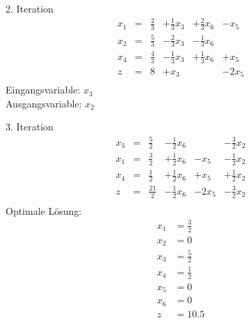\documentclass[a4paper]{scrartcl}
\begin{document}
\begin{enumerate}
\begin{enumerate}
                2. Iteration
                \begin{equation}
                    \begin{array}{rcrrrr}
                        x_1 & = & \frac{2}{3} & +\frac{1}{3}x_3 & +\frac{2}{3}x_6 & -x_5 \\
                        x_2 & = & \frac{5}{3} & -\frac{2}{3}x_3 & -\frac{1}{3}x_6 & \\
                        x_4 & = & \frac{4}{3} & -\frac{1}{3}x_3 & +\frac{1}{3}x_6 & +x_5 \\
                        \hline
                        z   & = & 8 & +x_3 & & -2x_5 \\
                    \end{array}
                \end{equation}
                Eingangsvariable: $x_3$ \\
                Ausgangsvariable: $x_2$

                3. Iteration
                \begin{equation}
                    \begin{array}{rcrrrr}
                        x_3 & = & \frac{5}{2} & -\frac{1}{2}x_6 & & -\frac{3}{2}x_2 \\
                        x_1 & = & \frac{3}{2} & +\frac{1}{2}x_6 & -x_5 & -\frac{1}{2}x_2 \\
                        x_4 & = & \frac{1}{2} & +\frac{1}{2}x_6 & +x_5 & +\frac{1}{2}x_2 \\
                        \hline
                        z   & = & \frac{21}{2} & -\frac{1}{2}x_6 & -2x_5 & -\frac{3}{2}x_2 \\
                    \end{array}
                \end{equation}
                Optimale Lösung:
                \begin{equation}
                    \begin{split}
                        x_1 &= \frac{3}{2} \\
                        x_2 &= 0 \\
                        x_3 &= \frac{5}{2} \\
                        x_4 &= \frac{1}{2} \\
                        x_5 &= 0 \\
                        x_6 &= 0 \\
                        z   &= \num{10,5}
                    \end{split}
                \end{equation}
                

\end{enumerate}
\end{enumerate}
\end{document}

